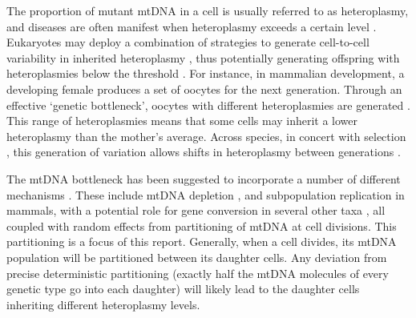 \documentclass{article}
\begin{document}
The proportion of mutant mtDNA in a cell is usually referred to as heteroplasmy, and diseases are often manifest when heteroplasmy exceeds a certain level \citep{rossignol2003mitochondrial}. Eukaryotes may deploy a combination of strategies to generate cell-to-cell variability in inherited heteroplasmy \citep{stewart2015dynamics, radzvilavicius2017mitigating, johnston2019varied, edwards2021avoiding}, thus potentially generating offspring with heteroplasmies below the threshold \citep{burr2018mitochondrial, burgstaller2014mtdna, segui2009mitochondrial}. For instance, in mammalian development, a developing female produces a set of oocytes for the next generation. Through an effective `genetic bottleneck', oocytes with different heteroplasmies are generated \citep{johnston2019varied}. This range of heteroplasmies means that some cells may inherit a lower heteroplasmy than the mother's average. Across species, in concert with selection \citep{fan2008mouse, stewart2008strong, hill2014selective, floros2018segregation, lieber2019mitochondrial, jakubke2021cristae}, this generation of variation allows shifts in heteroplasmy between generations \citep{burgstaller2018large, wei2019germline}.


The mtDNA bottleneck has been suggested to incorporate a number of different mechanisms \citep{johnston2015stochastic}. These include mtDNA depletion \citep{cree2008reduction, cao2007mitochondrial, cao2009new}, and subpopulation replication \citep{cao2007mitochondrial, wai2008mitochondrial} in mammals, with a potential role for gene conversion in several other taxa \citep{edwards2021avoiding}, all coupled with random effects from partitioning of mtDNA at cell divisions. This partitioning is a focus of this report. Generally, when a cell divides, its mtDNA population will be partitioned between its daughter cells. Any deviation from precise deterministic partitioning (exactly half the mtDNA molecules of every genetic type go into each daughter) will likely lead to the daughter cells inheriting different heteroplasmy levels. 

\end{document}

